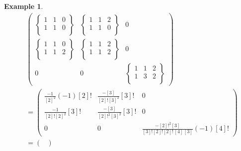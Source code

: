 \documentclass[a4paper, reqno]{amsart}
\newtheorem{example}[theorem]{Example}
\theoremstyle{introTheorems}
\renewcommand{\1}{\mathbbold{1}}
\begin{document}
\begin{example}
\begin{align*}
&\begin{pmatrix}
    \left\{
    \begin{matrix}
        1 & 1 & 0 \\
        1 & 1 & 0 \\
    \end{matrix} \right\} 
    &
    \left\{
    \begin{matrix}
        1 & 1 & 2 \\
        1 & 1 & 0 \\
    \end{matrix}\right\}
    & 
    0
    \\
    \left\{
    \begin{matrix}
        1 & 1 & 0 \\
        1 & 1 & 2 \\
    \end{matrix} \right\}
    &
    \left\{
    \begin{matrix}
        1 & 1 & 2 \\
        1 & 1 & 2 \\
    \end{matrix} \right\} 
    & 
    0  
    \\
    0
    &
    0
    &
    \left\{
    \begin{matrix}
        1 & 1 & 2 \\
        1 & 3 & 2 \\
    \end{matrix}  \right\} 
\end{pmatrix}
\\
&=
\begin{pmatrix}
\frac{-1}{[2]^2}
(-1)[2]!
&
\frac{-[3]}{[2]![3]^2}
[3]!
& 
0
\\
\frac{-1}{[2]![2]^2}
[3]!
&
\frac{-[3]}{[2]!^2[3]^2}
[3]!
& 
0
\\
0
&
0
&
\frac{-[2]!^2[3]}{[3]![2]![2]!\,[4]\,[3]}
(-1)[4]!
\end{pmatrix}
\\
&=
\begin{pmatrix}

\end{pmatrix}
\end{align*}
\end{example}
\end{document}
